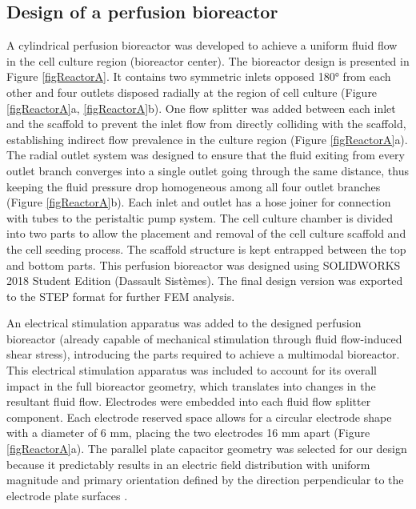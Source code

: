\subsection{Design of a perfusion bioreactor}
A cylindrical perfusion bioreactor was developed to achieve a uniform fluid flow in the cell culture region (bioreactor center). The bioreactor design is presented in Figure \ref{figReactorA}. It contains two symmetric inlets opposed 180\si{\degree} from each other and four outlets disposed radially at the region of cell culture (Figure \ref{figReactorA}a, \ref{figReactorA}b). One flow splitter was added between each inlet and the scaffold to prevent the inlet flow from directly colliding with the scaffold, establishing indirect flow prevalence in the culture region (Figure \ref{figReactorA}a). The radial outlet system was designed to ensure that the fluid exiting from every outlet branch converges into a single outlet going through the same distance, thus keeping the fluid pressure drop homogeneous among all four outlet branches (Figure \ref{figReactorA}b). Each inlet and outlet has a hose joiner for connection with tubes to the peristaltic pump system. The cell culture chamber is divided into two parts to allow the placement and removal of the cell culture scaffold and the cell seeding process.  The scaffold structure is kept entrapped between the top and bottom parts. This perfusion bioreactor was designed using SOLIDWORKS 2018 Student Edition (Dassault Sistèmes). The final design version was exported to the \acs{STEP} format for further \ac{FEM} analysis.

An electrical stimulation apparatus was added to the designed perfusion bioreactor (already capable of mechanical stimulation through fluid flow-induced shear stress), introducing the parts required to achieve a multimodal bioreactor. This electrical stimulation apparatus was included to account for its overall impact in the full bioreactor geometry, which translates into changes in the resultant fluid flow. Electrodes were embedded into each fluid flow splitter component. Each electrode reserved space allows for a circular electrode shape with a diameter of 6 \si{\milli\meter}, placing the two electrodes 16 \si{\milli\meter} apart (Figure \ref{figReactorA}a). The parallel plate capacitor geometry was selected for our design because it predictably results in an electric field distribution with uniform magnitude and primary orientation defined by the direction perpendicular to the electrode plate surfaces \cite{Sherman1982-jz}.


